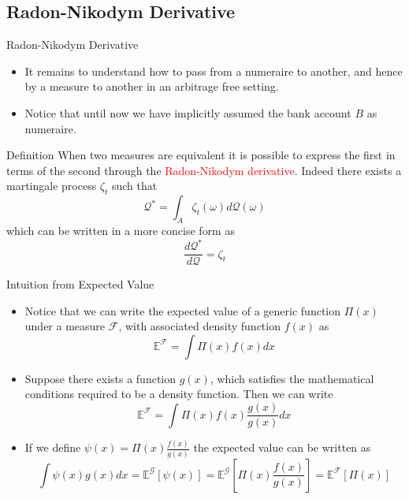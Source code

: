 \documentclass{beamer}
\begin{document}
\subsection{Radon-Nikodym Derivative}
\begin{frame}{Radon-Nikodym Derivative}
\begin{itemize}
	\item It remains to understand how to pass from a numeraire to another, and hence by a measure to another in an arbitrage free setting.
	\item Notice that until now we have implicitly assumed the bank account $B$ as numeraire.
	\end{itemize}
\begin{block}{Definition}
When two measures are equivalent it is possible to express the first in terms of the second through the \textcolor{red}{Radon-Nikodym derivative}. Indeed there exists a martingale process $\zeta_t$ such that
\begin{equation*}
	\mathcal{Q}^* =\int_{A} \zeta_t(\omega)d\mathcal{Q}(\omega)
\end{equation*}
which can be written in a more concise form as
\begin{equation}
	\frac{d\mathcal{Q}^*}{d\mathcal{Q}} = \zeta_t
	\label{eq:radon_nikodym_der}
\end{equation}
\end{block}
\end{frame}

\begin{frame}{Intuition from Expected Value}
	\begin{itemize}
		\item Notice that we can write the expected value of a generic function $\Pi(x)$ under a measure $\mathcal{F}$, with associated density function $f(x)$ as
		\begin{equation*}
			\mathbb{E}^\mathcal{F}=\int\Pi(x)f(x)dx
		\end{equation*}
		\item Suppose there exists a function $g(x)$, which satisfies the mathematical conditions required to be a density function. Then we can write
		\begin{equation*}
			\mathbb{E}^\mathcal{F}=\int\Pi(x)f(x)\frac{g(x)}{g(x)}dx
		\end{equation*}
		\item If we define $\psi(x)=\Pi(x)\frac{f(x)}{g(x)}$ the expected value can be written as 
		\begin{equation*}
			\int\psi(x)g(x)dx=\mathbb{E}^\mathcal{G}\left[\psi(x)\right]=\mathbb{E}^{\mathcal{G}}\left[\Pi(x)\frac{f(x)}{g(x)}\right]=\mathbb{E}^\mathcal{F}\left[\Pi(x)\right]
		\end{equation*}
	\end{itemize}
\end{frame}
\end{document}
